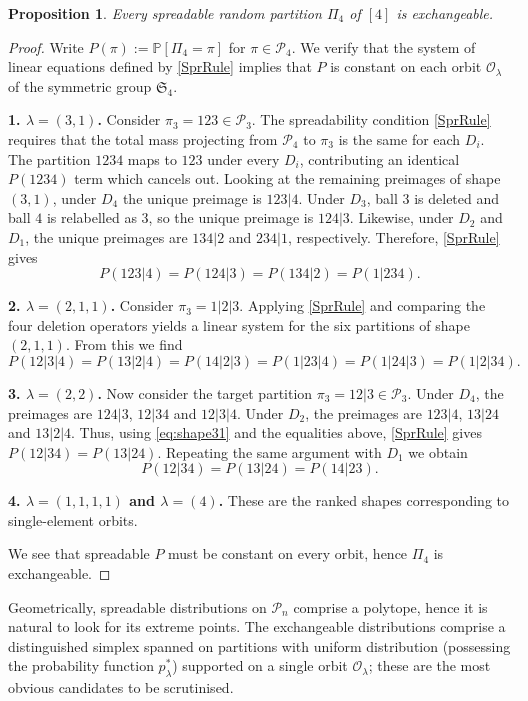 \documentclass{article}
\newtheorem{proposition}{Proposition}
\begin{document}
\begin{proposition}\label{n=4}
Every spreadable random partition $\Pi_4$ of $[4]$ is exchangeable.
\end{proposition}
\begin{proof}
Write $P(\pi):=\mathbb P[\Pi_4=\pi]$ for $\pi\in\mathcal P_4$. We verify
that the system of linear equations defined by \eqref{SprRule} implies that
$P$ is constant on each orbit ${\mathcal O}_\lambda$
of the symmetric group $\mathfrak S_4$.


{\bf 1. $\lambda=(3,1)$.} Consider $\pi_3=123\in\mathcal P_3$. The spreadability
condition \eqref{SprRule} requires that the total  mass projecting from $\mathcal P_4$
to $\pi_3$ is the same for each $D_i$. The partition $1234$ 
maps to $123$ under every $D_i$, contributing an identical $P(1234)$ term which cancels 
out. Looking at the remaining preimages of shape $(3,1)$, 
under $D_4$ the unique preimage is $123|4$. Under $D_3$, ball $3$
is deleted and ball $4$ is relabelled as $3$, so the unique preimage is
$124|3$. Likewise, under $D_2$ and $D_1$, the unique preimages are $134|2$
and $234|1$, respectively. Therefore,  \eqref{SprRule} gives
\begin{equation}\label{eq:shape31}
P(123|4)
=
P(124|3)
=
P(134|2)
=
P(1|234).
\end{equation}




{\bf 2.  $\lambda=(2,1,1)$.}
Consider  $\pi_3=1|2|3$. Applying
\eqref{SprRule} and comparing the four deletion operators yields a linear
system for the six partitions of shape $(2,1,1)$. From this we find 
\[
P(12|3|4)
=
P(13|2|4)
=
P(14|2|3)
=
P(1|23|4)
=
P(1|24|3)
=
P(1|2|34).
\]


{\bf 3. $\lambda=(2,2)$.}
Now consider the target partition $\pi_3=12|3\in\mathcal P_3$. Under $D_4$,
the preimages are $124|3$, $12|34$ and $12|3|4$. Under $D_2$, the preimages are
$123|4$, $13|24$ and $13|2|4$. Thus, using \eqref{eq:shape31} and the equalities above, \eqref{SprRule} gives
$P(12|34)=P(13|24).$
Repeating the same argument with $D_1$ we
obtain
\[
P(12|34)
=
P(13|24)
=
P(14|23).
\]

{\bf 4. $\lambda=(1,1,1,1)$ and $\lambda=(4)$.} These are the  ranked shapes corresponding to single-element orbits.


We see that spreadable $P$ must be constant on every orbit, hence $\Pi_4$ is exchangeable.
\end{proof}



Geometrically,  spreadable distributions on ${\mathcal P}_n$ comprise a polytope, hence it is natural to look for its extreme points. 
The exchangeable distributions comprise a distinguished simplex spanned on partitions with uniform distribution (possessing the probability function $p^*_\lambda$) supported on a single orbit $\mathcal O_\lambda$;
these are the most obvious  candidates to be scrutinised.  
\end{document}
